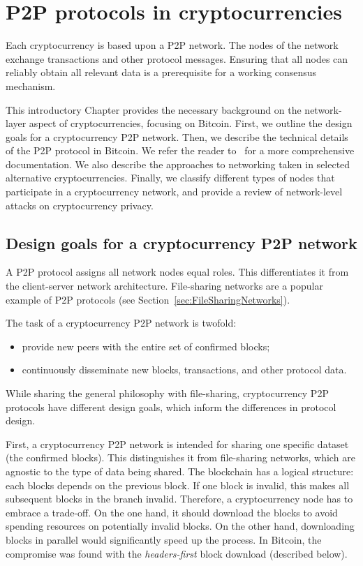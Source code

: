 \chapter{P2P protocols in cryptocurrencies}

\label{Chapter02IntroP2P}

Each cryptocurrency is based upon a P2P network.
The nodes of the network exchange transactions and other protocol messages.
Ensuring that all nodes can reliably obtain all relevant data is a prerequisite for a working consensus mechanism.

This introductory Chapter provides the necessary background on the network-layer aspect of cryptocurrencies, focusing on Bitcoin.
First, we outline the design goals for a cryptocurrency P2P network.
Then, we describe the technical details of the P2P protocol in Bitcoin.
We refer the reader to~\cite{BitcoinWiki, Garay2015} for a more comprehensive documentation.
We also describe the approaches to networking taken in selected alternative cryptocurrencies.
Finally, we classify different types of nodes that participate in a cryptocurrency network, and provide a review of network-level attacks on cryptocurrency privacy.


\section{Design goals for a cryptocurrency P2P network}

A P2P protocol assigns all network nodes equal roles.
This differentiates it from the client-server network architecture.
File-sharing networks are a popular example of P2P protocols (see Section~\ref{sec:FileSharingNetworks}).

The task of a cryptocurrency P2P network is twofold:
\begin{itemize}
	\item provide new peers with the entire set of confirmed blocks;
	\item continuously disseminate new blocks, transactions, and other protocol data.
\end{itemize}

While sharing the general philosophy with file-sharing, cryptocurrency P2P protocols have different design goals, which inform the differences in protocol design.

First, a cryptocurrency P2P network is intended for sharing one specific dataset (the confirmed blocks).
This distinguishes it from file-sharing networks, which are agnostic to the type of data being shared.
The blockchain has a logical structure: each blocks depends on the previous block.
If one block is invalid, this makes all subsequent blocks in the branch invalid.
Therefore, a cryptocurrency node has to embrace a trade-off.
On the one hand, it should download the blocks to avoid spending resources on potentially invalid blocks.
On the other hand, downloading blocks in parallel would significantly speed up the process.
In Bitcoin, the compromise was found with the \textit{headers-first} block download (described below).

